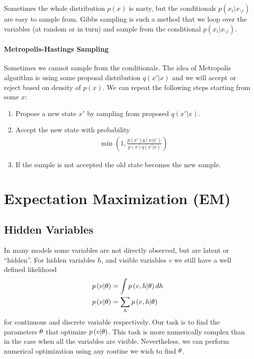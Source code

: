 Sometimes the whole distribution $p(x)$ is nasty, but the conditionals $p(x_i|x_{\setminus i})$ are easy to sample from. Gibbs sampling is such a method that we loop over the variables (at random or in turn) and sample from the conditional $p(x_i|x_{\setminus i})$.

\paragraph{Metropolis-Hastings Sampling}

Sometimes we cannot sample from the conditionals. The idea of Metropolis algorithm is using some proposal distribution $q(x'|x)$ and we will accept or reject based on density of $p(x)$. We can repeat the following steps starting from some $x$:
\begin{enumerate}
	\item Propose a new state $x'$ by sampling from proposed $q(x'|x)$.
	\item Accept the new state with probability
	\begin{align*}
	\min\left(1,\frac{p(x')q(x|x')}{p(x)q(x'|x)}\right)
	\end{align*}
	\item If the sample is not accepted the old state becomes the new sample.
\end{enumerate}



\section{Expectation Maximization (EM)}
\label{section12.2}

\subsection{Hidden Variables}

In many models some variables are not directly observed, but are latent or ``hidden''. For hidden variables $h$, and visible variables $v$ we still have a well defined likelihood
\begin{align*}
	p\left(v|\theta\right)&=\int p\left(v,h|\theta\right)dh \\
	p\left(v|\theta\right)&=\sum_hp\left(v,h|\theta\right)
\end{align*}
for continuous and discrete variable respectively. Our task is to find the parameters $\theta$ that optimize $p\left(v|\theta\right)$. This task is more numerically complex than in the case when all the variables are visible. Nevertheless, we can perform numerical optimization using any routine we wish to find $\theta$.

